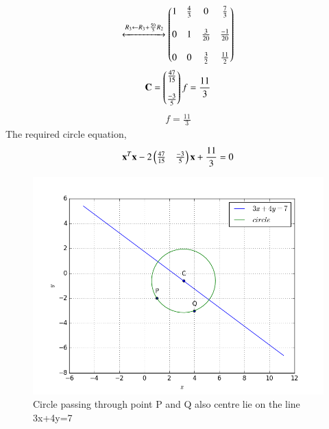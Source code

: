 \begin{align}
\xleftrightarrow{R_3\leftarrow R_3 + \frac{50}{3}R_2}
\begin{pmatrix}1 & \frac{4}{3} & 0 & \frac{7}{3}\\ \\
0 & 1 & \frac{3}{20} & \frac{-1}{20} \\ \\
0 & 0 & \frac{3}{2} & \frac{11}{2}\end{pmatrix}
\end{align}
\begin{align}
\mathbf{C} = \begin{pmatrix}\frac{47}{15}  \\ \\ \frac{-3}{5} \end{pmatrix}
f = \frac{11}{3}
\end{align}
\begin{align}
f = \frac{11}{3}
\end{align}
The required circle equation,
\begin{align}
\mathbf{x}^T\mathbf{x}-2\begin{pmatrix}\frac{47}{15} & \frac{-3}{5} \end{pmatrix}\mathbf{x} + \frac{11}{3} = 0
\end{align}

\begin{figure}[!ht]
\centering
\includegraphics[width=\columnwidth]{./solutions/17/13/figure.png}
\caption{Circle passing through point P and Q also centre lie on the line 3x+4y=7}
\label{eq:solutions/17/13/Fig}
\end{figure}
